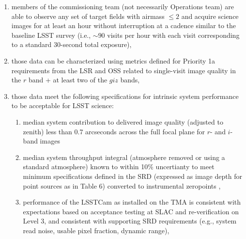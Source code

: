 \documentclass[SE,authoryear,toc,lsstdraft]{lsstdoc}
\begin{document}
\begin{enumerate}
  \item members of the commissioning team (not necessarily Operations team) are able to observe any set of target fields with airmass $\leq 2$ and acquire science images for at least an hour without interruption at a cadence similar to the baseline LSST survey (i.e., $\sim90$ visits per hour with each visit corresponding to a standard 30-second total exposure),
  \item those data can be characterized using metrics defined for Priority 1a requirements from the LSR  and OSS  related to single-visit image quality in the $r$ band + at least two of the $giz$ bands,
  \item those data meet the following specifications for intrinsic system performance to be acceptable for LSST science:
  \begin{enumerate}
    \item median system contribution to delivered image quality (adjusted to zenith) less than 0.7 arcseconds across the full focal plane for $r$- and $i$-band images
    \item median system throughput integral (atmosphere removed or using a standard atmosphere) known to within 10\% uncertianty to meet minimum specifications defined in the SRD (expressed as image depth for point sources as in Table 6) converted to instrumental zeropoints ,
    \item performance of the LSSTCam as installed on the TMA is consistent with expectations based on acceptance testing at SLAC and re-verification on Level 3, and consistent with supporting SRD requirements (e.g., system read noise, usable pixel fraction, dynamic range),

\end{enumerate}
\end{enumerate}
\end{document}
